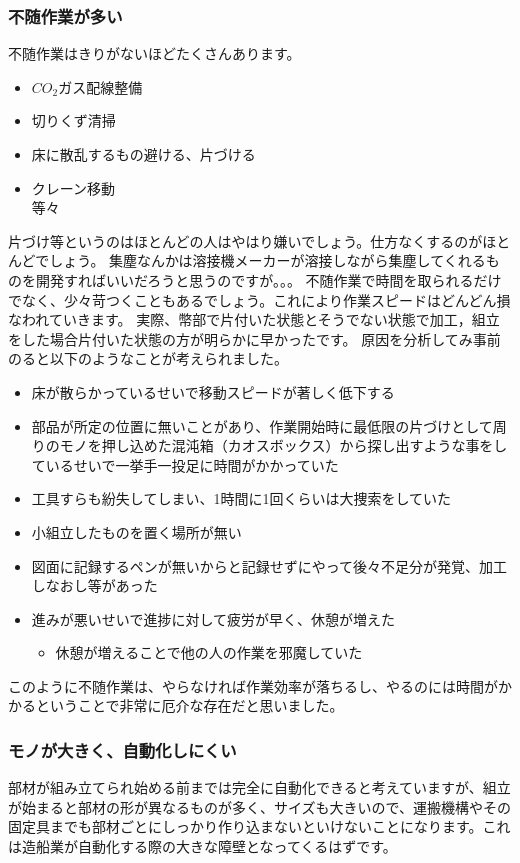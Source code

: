 \documentclass[dvipdfmx,a4paper]{jsarticle}
\begin{document}
\subsubsection{不随作業が多い}
不随作業はきりがないほどたくさんあります。
\begin{itemize}
    \item $CO_2$ガス配線整備
    \item 切りくず清掃
    \item 床に散乱するもの避ける、片づける
    \item クレーン移動\\
    等々
\end{itemize}
片づけ等というのはほとんどの人はやはり嫌いでしょう。仕方なくするのがほとんどでしょう。
集塵なんかは溶接機メーカーが溶接しながら集塵してくれるものを開発すればいいだろうと思うのですが。。。
不随作業で時間を取られるだけでなく、少々苛つくこともあるでしょう。これにより作業スピードはどんどん損なわれていきます。
実際、幣部で片付いた状態とそうでない状態で加工，組立をした場合片付いた状態の方が明らかに早かったです。
原因を分析してみ事前のると以下のようなことが考えられました。
\begin{itemize}
    \item 床が散らかっているせいで移動スピードが著しく低下する
    \item 部品が所定の位置に無いことがあり、作業開始時に最低限の片づけとして周りのモノを押し込めた混沌箱（カオスボックス）から探し出すような事をしているせいで一挙手一投足に時間がかかっていた
    \item 工具すらも紛失してしまい、1時間に1回くらいは大捜索をしていた
    \item 小組立したものを置く場所が無い
    \item 図面に記録するペンが無いからと記録せずにやって後々不足分が発覚、加工しなおし等があった
    \item 進みが悪いせいで進捗に対して疲労が早く、休憩が増えた
    \begin{itemize}
        \item 休憩が増えることで他の人の作業を邪魔していた
    \end{itemize}
\end{itemize}
このように不随作業は、やらなければ作業効率が落ちるし、やるのには時間がかかるということで非常に厄介な存在だと思いました。


\subsubsection{モノが大きく、自動化しにくい}
部材が組み立てられ始める前までは完全に自動化できると考えていますが、組立が始まると部材の形が異なるものが多く、サイズも大きいので、運搬機構やその固定具までも部材ごとにしっかり作り込まないといけないことになります。これは造船業が自動化する際の大きな障壁となってくるはずです。
\end{document}
